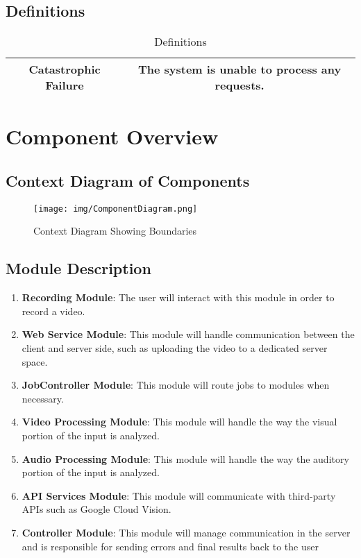 \documentclass{article}
\begin{document}
\subsection{Definitions}

\begin{table}[H]
    \centering
    \begin{tabular}{|c|c|} 
        \hline
         Catastrophic Failure & The system is unable to process any requests.\\ \hline
    \end{tabular}
    \caption{Definitions}
    \label{tab:Definitions}
\end{table}

\section{Component Overview}

\subsection{Context Diagram of Components}

\begin{figure}[H]
    \centering
    \texttt{[image: img/ComponentDiagram.png]}
    \caption{Context Diagram Showing Boundaries}
    \label{fig:Context}
\end{figure}

\subsection{Module Description}

\renewcommand{\labelenumi}{\Alph{enumi}}
\begin{enumerate}
    \item \textbf{Recording Module}: The user will interact with this module in order to record a video.
    \item \textbf{Web Service Module}: This module will handle communication between the client and server side, such as uploading the video to a dedicated server space.
    \item \textbf{JobController Module}: This module will route jobs to modules when necessary.
    \item \textbf{Video Processing Module}: This module will handle the way the visual portion of the input is analyzed.
    \item \textbf{Audio Processing Module}: This module will handle the way the auditory portion of the input is analyzed.
    \item \textbf{API Services Module}: This module will communicate with third-party APIs such as Google Cloud Vision.
    \item \textbf{Controller Module}: This module will manage communication in the server and is responsible for sending errors and final results back to the user
\end{enumerate}
\end{document}
